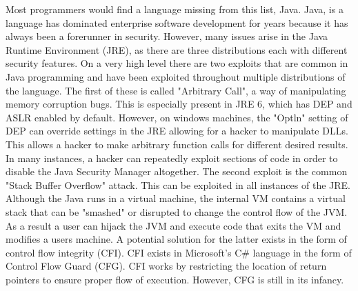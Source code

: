 \documentclass{article}
\newcommand\tab[1][1cm]{\hspace*{#1}}
\begin{document}
\tab Most programmers would find a language missing from this list, Java. Java, is a language has dominated enterprise software development for years because it has always been a forerunner in security. However, many issues arise in the Java Runtime Environment (JRE), as there are three distributions each with different security features. On a very high level there are two exploits that are common in Java programming and have been exploited throughout multiple distributions of the language. The first of these is called "Arbitrary Call", a way of manipulating memory corruption bugs. This is especially present in JRE 6, which has DEP and ASLR enabled by default. However, on windows machines, the "Optln" setting of DEP can override settings in the JRE allowing for a hacker to manipulate DLLs. This allows a hacker to make arbitrary function calls for different desired results. In many instances, a hacker can repeatedly exploit sections of code in order to disable the Java Security Manager altogether. The second exploit is the common "Stack Buffer Overflow" attack. This can be exploited in all instances of the JRE. Although the Java runs in a virtual machine, the internal VM contains a virtual stack that can be "smashed" or disrupted to change the control flow of the JVM. As a result a user can hijack the JVM and execute code that exits the VM and modifies a users machine. A potential solution for the latter exists in the form of control flow integrity (CFI). CFI exists in Microsoft's C# language in the form of Control Flow Guard (CFG). CFI works by restricting the location of return pointers to ensure proper flow of execution. However, CFG is still in its infancy.
\\
\end{document}
